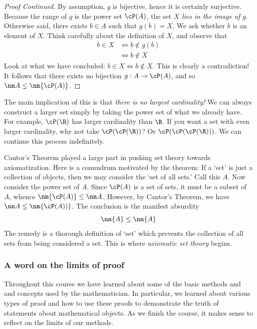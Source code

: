 \begin{proof}[Proof Continued]  
By assumption, $g$ is bijective, hence it is certainly surjective. Because the range of $g$ is the power set $\cP(A)$, the set \emph{$X$ lies in the image of $g$.} Otherwise said, there exists $b\in A$ such that $g(b)=X$. We ask whether $b$ is an element of $X$. Think carefully about the definition of $X$, and observe that
\begin{align*}
b\in X&\iff b\not\in g(b)\tag*{(by the definition of $X$)}\\
&\iff b\not\in X\tag*{(since $X=g(b)$)}
\end{align*}
Look at what we have concluded: $b\in X\iff b\not\in X$. This is clearly a contradiction!\\[2pt]
It follows that there exists no bijection $g:A\to\cP(A)$, and so $\nm A\lneq\nm{\cP(A)}$.
\end{proof}

\noindent The main implication of this is that \emph{there is no largest cardinality!} We can always construct a larger set simply by taking the power set of what we already have. For example, $\cP(\R)$ has larger cardinality than $\R$. If you want a set with even larger cardinality, why not take $\cP(\cP(\R))$? Or $\cP(\cP(\cP(\R)))$. We can continue this process indefinitely.

Cantor's Theorem played a large part in pushing set theory towards axiomatization. Here is a conundrum motivated by the theorem: If a `set' is just a collection of objects, then we may consider the `set of all sets.' Call this $A$. Now consider the power set of $A$. Since $\cP(A)$ is a set of sets, it must be a subset of $A$, whence $\nm{\cP(A)}\le\nm A$. However, by Cantor's Theorem, we have $\nm A\lneq\nm{\cP(A))}$. The conclusion is the manifest absurdity
\[\nm{A}\lneq\nm{A}\]
The remedy is a thorough definition of `set' which prevents the collection of all sets from being considered a set. This is where \emph{axiomatic set theory} begins. 

\subsubsection*{A word on the limits of proof}

Throughout this course we have learned about some of the basic methods and and concepts used by the mathematician. In particular, we learned about various types of proof and how to use these proofs to demonstrate the truth of statements about mathematical objects. As we finish the course, it makes sense to reflect on the limits of our methods. 

